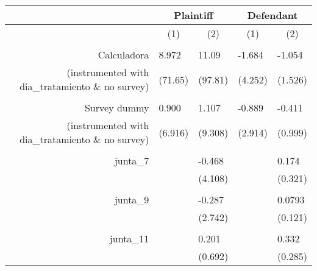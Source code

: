\begin{tabular}{rrrrr}
\toprule
      & \multicolumn{2}{c}{Plaintiff} & \multicolumn{2}{c}{Defendant} \\
\midrule
      & \multicolumn{1}{c}{(1)} & \multicolumn{1}{c}{(2)} & \multicolumn{1}{c}{(1)} & \multicolumn{1}{c}{(2)} \\
      &       &       &       &  \\
Calculadora  & \multicolumn{1}{l}{8.972} & \multicolumn{1}{l}{11.09} & \multicolumn{1}{l}{-1.684} & \multicolumn{1}{l}{-1.054} \\
(instrumented with dia\_tratamiento \& no survey) & \multicolumn{1}{l}{(71.65)} & \multicolumn{1}{l}{(97.81)} & \multicolumn{1}{l}{(4.252)} & \multicolumn{1}{l}{(1.526)} \\
      & \multicolumn{1}{l}{} & \multicolumn{1}{l}{} & \multicolumn{1}{l}{} & \multicolumn{1}{l}{} \\
Survey dummy & \multicolumn{1}{l}{0.900} & \multicolumn{1}{l}{1.107} & \multicolumn{1}{l}{-0.889} & \multicolumn{1}{l}{-0.411} \\
(instrumented with dia\_tratamiento \& no survey) & \multicolumn{1}{l}{(6.916)} & \multicolumn{1}{l}{(9.308)} & \multicolumn{1}{l}{(2.914)} & \multicolumn{1}{l}{(0.999)} \\
      & \multicolumn{1}{l}{} & \multicolumn{1}{l}{} & \multicolumn{1}{l}{} & \multicolumn{1}{l}{} \\
junta\_7 & \multicolumn{1}{l}{} & \multicolumn{1}{l}{-0.468} & \multicolumn{1}{l}{} & \multicolumn{1}{l}{0.174} \\
      & \multicolumn{1}{l}{} & \multicolumn{1}{l}{(4.108)} & \multicolumn{1}{l}{} & \multicolumn{1}{l}{(0.321)} \\
      & \multicolumn{1}{l}{} & \multicolumn{1}{l}{} & \multicolumn{1}{l}{} & \multicolumn{1}{l}{} \\
junta\_9 & \multicolumn{1}{l}{} & \multicolumn{1}{l}{-0.287} & \multicolumn{1}{l}{} & \multicolumn{1}{l}{0.0793} \\
      & \multicolumn{1}{l}{} & \multicolumn{1}{l}{(2.742)} & \multicolumn{1}{l}{} & \multicolumn{1}{l}{(0.121)} \\
      & \multicolumn{1}{l}{} & \multicolumn{1}{l}{} & \multicolumn{1}{l}{} & \multicolumn{1}{l}{} \\
junta\_11 & \multicolumn{1}{l}{} & \multicolumn{1}{l}{0.201} & \multicolumn{1}{l}{} & \multicolumn{1}{l}{0.332} \\
      & \multicolumn{1}{l}{} & \multicolumn{1}{l}{(0.692)} & \multicolumn{1}{l}{} & \multicolumn{1}{l}{(0.285)} \\

\end{tabular}
